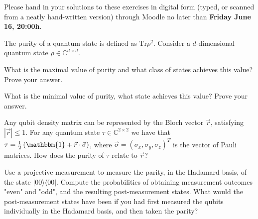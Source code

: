 \documentclass[a4paper,10pt,landscape,twocolumn]{scrartcl}
\newcommand{\proj}[1]{| #1 \rangle \langle #1 |}
\newcommand{\Tr}{\text{Tr}}
\newcommand\deadline{Friday June 16, 20:00h}
\begin{document}
\homeworkproblems

{\sffamily\noindent
Please hand in your solutions to these exercises in digital form (typed, or scanned from a neatly hand-written version) through Moodle no later than \textbf{\deadline}.  %
}


\begin{exercise}[Purity]
The purity of a quantum state is defined as $\Tr\rho^2$. Consider a $d$-dimensional quantum state $\rho\in \mathbb{C}^{d\times d}$.
\begin{subex}
What is the maximal value of purity and what class of states achieves this value? Prove your answer.
\end{subex}
\begin{subex}
What is the minimal value of purity, what state achieves this value? Prove your answer.
\end{subex}

\begin{subex}
Any qubit density matrix can be represented by the Bloch vector $\vec{r}$, satisfying $|\vec{r}|\leq 1$. For any quantum state $\tau\in \mathbb{C}^{2\times 2}$ we have that $\tau= \frac{1}{2}\left( \mathbbm{1} + \vec{r}\cdot \vec{\sigma} \right)$, where $\vec{\sigma}=(\sigma_x,\sigma_y,\sigma_z)^T$ is the vector of Pauli matrices. How does the purity of $\tau$ relate to $\vec{r}$?
\end{subex}

\end{exercise}



\begin{exercise}
Use a projective measurement to measure the parity, in the Hadamard basis, of
the state $\proj{00}$. Compute the probabilities of obtaining measurement outcomes "even" and
"odd", and the resulting post-measurement states. What would the post-measurement states have
been if you had first measured the qubits individually in the Hadamard basis, and then taken the
parity?
\end{exercise}
\end{document}
